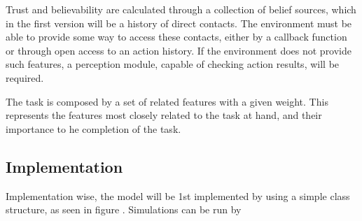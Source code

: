 Trust and believability are calculated through a collection of belief sources, which in the first version will be a history of direct contacts. The environment must be able to provide some way to access these contacts, either by a callback function or through open access to an action history. If the environment does not provide such features, a perception module, capable of checking action results, will be required.

The task is composed by a set of related features with a given weight. This represents the features most closely related to the task at hand, and their importance to he completion of the task.

\subsection{Implementation}

Implementation wise, the model will be 1st implemented by using a simple class structure, as seen in figure %
. Simulations can be run by





